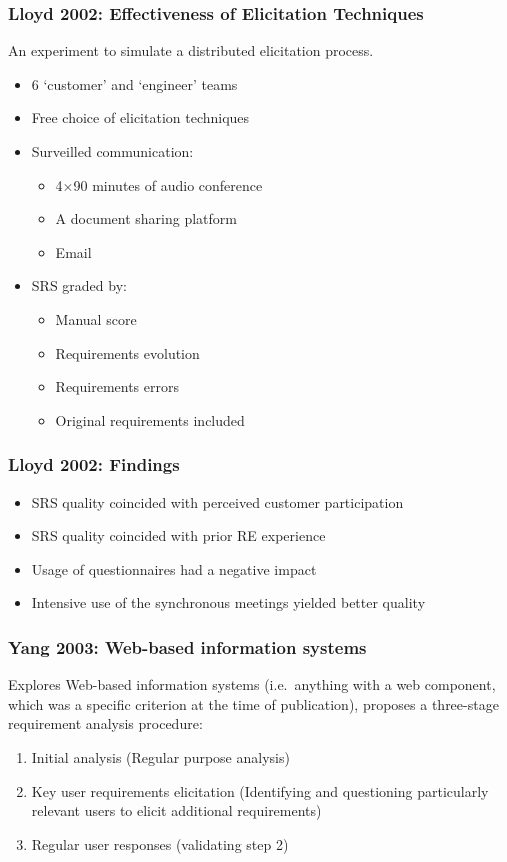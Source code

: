 \documentclass{beamer}
\begin{document}
\begin{frame}
\frametitle{Lloyd 2002: Effectiveness of Elicitation Techniques}
An experiment to simulate a distributed elicitation process.

\begin{itemize}
\item 6 `customer' and `engineer' teams
\item Free choice of elicitation techniques
\item Surveilled communication:
  \begin{itemize}
  \item 4$\times$90 minutes of audio conference
  \item A document sharing platform
  \item Email
  \end{itemize}
\item SRS graded by:
  \begin{itemize}
  \item Manual score
  \item Requirements evolution
  \item Requirements errors
  \item Original requirements included
  \end{itemize}
\end{itemize}
\end{frame}

\begin{frame}
\frametitle{Lloyd 2002: Findings}
\begin{itemize}
\item SRS quality coincided with perceived customer participation
\item SRS quality coincided with prior RE experience
\item Usage of questionnaires had a negative impact
\item Intensive use of the synchronous meetings yielded better quality
\end{itemize}
\end{frame}


\begin{frame}
\frametitle{Yang 2003: Web-based information systems}
Explores Web-based information systems (i.e.\ anything with a web component, which was a specific criterion at the time of publication), proposes a three-stage requirement analysis procedure:
\begin{enumerate}
\item Initial analysis (Regular purpose analysis)
\item Key user requirements elicitation (Identifying and questioning particularly relevant users to elicit additional requirements)
\item Regular user responses (validating step 2)
\end{enumerate}
\end{frame}
\end{document}
